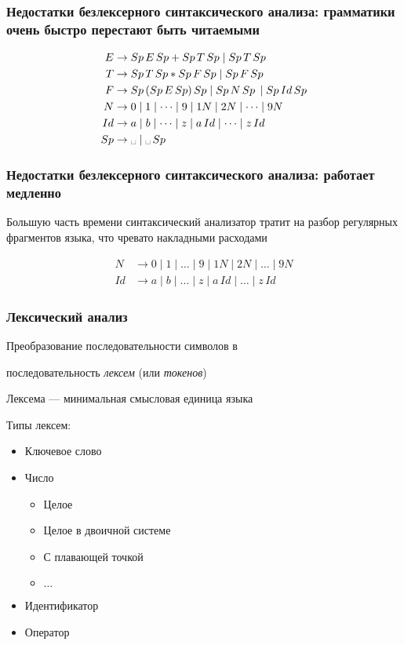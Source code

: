 \documentclass{beamer}
\begin{document}
\begin{frame}[fragile]
  \frametitle{Недостатки безлексерного синтаксического анализа: грамматики очень быстро перестают быть читаемыми}

  \begin{align*}
    E &\to Sp \, E \, Sp + Sp \, T \, Sp \mid Sp \, T \, Sp \\
    T &\to Sp \, T \, Sp * Sp \, F \, Sp \mid Sp \, F \, Sp  \\
    F &\to Sp \, ( Sp \, E \, Sp) \, Sp \mid Sp \, N \, Sp \, \mid Sp \, Id \, Sp \\
    N &\to 0 \mid 1 \mid \dots \mid 9 \mid 1N \mid 2N \mid \dots \mid 9N \\
    Id &\to a \mid b \mid \dots \mid z \mid a \, Id \mid \dots \mid z \, Id \\
    Sp &\to \text{\textvisiblespace} \mid \text{\textvisiblespace} \, Sp
  \end{align*}
\end{frame}

\begin{frame}[fragile]
  \frametitle{Недостатки безлексерного синтаксического анализа: работает медленно}

  Большую часть времени синтаксический анализатор тратит на разбор регулярных фрагментов языка, что чревато накладными расходами

  \begin{align*}
    N &\to 0 \mid 1 \mid \dots \mid 9 \mid 1N \mid 2N \mid \dots \mid 9N \\
    Id &\to a \mid b \mid \dots \mid z \mid a \, Id \mid \dots \mid z \, Id
  \end{align*}
\end{frame}

\begin{frame}[fragile]
  \frametitle{Лексический анализ}
\begin{center}
  Преобразование последовательности символов в

  последовательность \emph{лексем} (или \emph{токенов})
\end{center}

\begin{center}
  Лексема --- минимальная смысловая единица языка
\end{center}


  Типы лексем:
  \begin{itemize}
    \item Ключевое слово
    \item Число
    \begin{itemize}
      \item Целое
      \item Целое в двоичной системе
      \item С плавающей точкой
      \item $\dots$
    \end{itemize}
    \item Идентификатор
    \item Оператор
  \end{itemize}
\end{frame}
\end{document}
